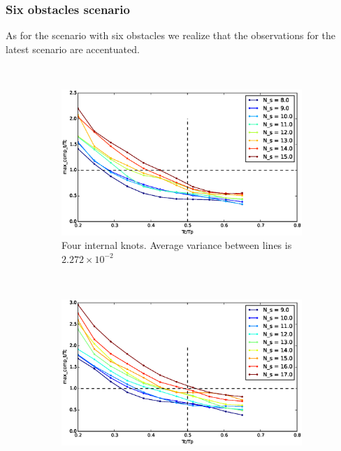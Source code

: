 \subsubsection{Six obstacles scenario}


As for the scenario with six obstacles we realize that the observations for the latest scenario are accentuated.

\begin{figure}[!h]
        \centering
        ~ %
        \begin{subfigure}[b]{0.48\textwidth}
                \includegraphics[width=\textwidth]{./img/realtime/Scenario_6__N_knots_4/mcttc-tctp.eps}
                \caption{Four internal knots.  Average variance between lines is $2.272\times 10^{-2}$}\label{fig:uni64}
        \end{subfigure}
        ~ %
        \begin{subfigure}[b]{0.48\textwidth}
                \includegraphics[width=\textwidth]{./img/realtime/Scenario_6__N_knots_5/mcttc-tctp.eps}

\end{subfigure}
\end{figure}
